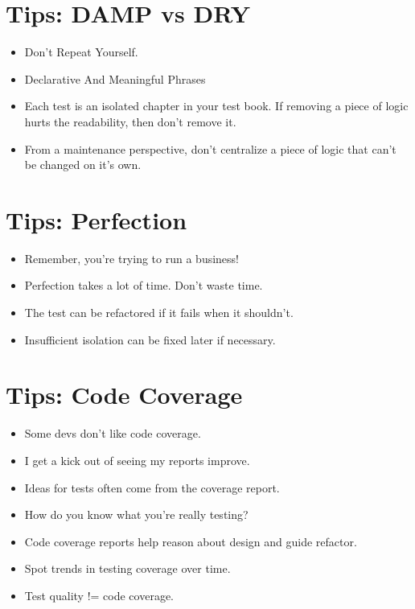 \documentclass{article}
\begin{document}
\newpage
\section{Tips: DAMP vs DRY}
\begin{itemize}
    \item Don't Repeat Yourself.
    \item Declarative And Meaningful Phrases
    \item Each test is an isolated chapter in your test book. If removing a
        piece of logic hurts the readability, then don't remove it.
    \item From a maintenance perspective, don't centralize a piece of logic that
        can't be changed on it's own.
\end{itemize}

\newpage
\section{Tips: Perfection}
\begin{itemize}
    \item Remember, you're trying to run a business!
    \item Perfection takes a lot of time. Don't waste time.
    \item The test can be refactored if it fails when it shouldn't.
    \item Insufficient isolation can be fixed later if necessary.
\end{itemize}

\newpage
\section{Tips: Code Coverage}
\begin{itemize}
    \item Some devs don't like code coverage.
    \item I get a kick out of seeing my reports improve.
    \item Ideas for tests often come from the coverage report.
    \item How do you know what you're really testing?
    \item Code coverage reports help reason about design and guide refactor.
    \item Spot trends in testing coverage over time.
    \item Test quality != code coverage.
\end{itemize}
\end{document}
